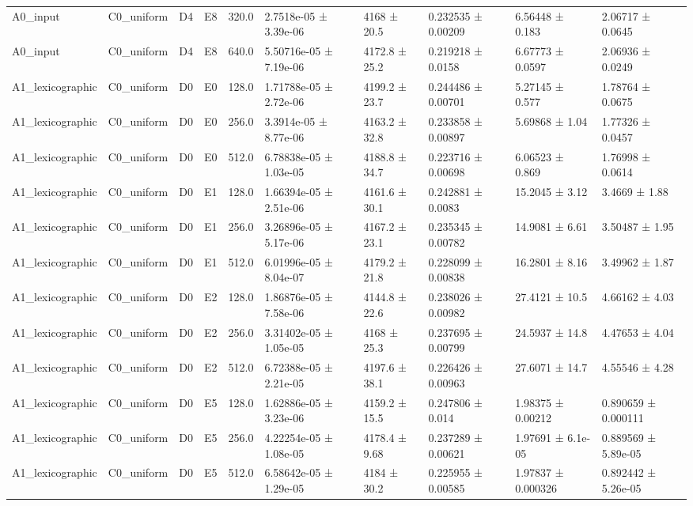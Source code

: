 \begin{table}
\begin{tabular}{llllllllll}
A0\_input & C0\_uniform & D4 & E8 & 320.0 & 2.7518e-05 ± 3.39e-06 & 4168 ± 20.5 & 0.232535 ± 0.00209 & 6.56448 ± 0.183 & 2.06717 ± 0.0645 \\
A0\_input & C0\_uniform & D4 & E8 & 640.0 & 5.50716e-05 ± 7.19e-06 & 4172.8 ± 25.2 & 0.219218 ± 0.0158 & 6.67773 ± 0.0597 & 2.06936 ± 0.0249 \\
A1\_lexicographic & C0\_uniform & D0 & E0 & 128.0 & 1.71788e-05 ± 2.72e-06 & 4199.2 ± 23.7 & 0.244486 ± 0.00701 & 5.27145 ± 0.577 & 1.78764 ± 0.0675 \\
A1\_lexicographic & C0\_uniform & D0 & E0 & 256.0 & 3.3914e-05 ± 8.77e-06 & 4163.2 ± 32.8 & 0.233858 ± 0.00897 & 5.69868 ± 1.04 & 1.77326 ± 0.0457 \\
A1\_lexicographic & C0\_uniform & D0 & E0 & 512.0 & 6.78838e-05 ± 1.03e-05 & 4188.8 ± 34.7 & 0.223716 ± 0.00698 & 6.06523 ± 0.869 & 1.76998 ± 0.0614 \\
A1\_lexicographic & C0\_uniform & D0 & E1 & 128.0 & 1.66394e-05 ± 2.51e-06 & 4161.6 ± 30.1 & 0.242881 ± 0.0083 & 15.2045 ± 3.12 & 3.4669 ± 1.88 \\
A1\_lexicographic & C0\_uniform & D0 & E1 & 256.0 & 3.26896e-05 ± 5.17e-06 & 4167.2 ± 23.1 & 0.235345 ± 0.00782 & 14.9081 ± 6.61 & 3.50487 ± 1.95 \\
A1\_lexicographic & C0\_uniform & D0 & E1 & 512.0 & 6.01996e-05 ± 8.04e-07 & 4179.2 ± 21.8 & 0.228099 ± 0.00838 & 16.2801 ± 8.16 & 3.49962 ± 1.87 \\
A1\_lexicographic & C0\_uniform & D0 & E2 & 128.0 & 1.86876e-05 ± 7.58e-06 & 4144.8 ± 22.6 & 0.238026 ± 0.00982 & 27.4121 ± 10.5 & 4.66162 ± 4.03 \\
A1\_lexicographic & C0\_uniform & D0 & E2 & 256.0 & 3.31402e-05 ± 1.05e-05 & 4168 ± 25.3 & 0.237695 ± 0.00799 & 24.5937 ± 14.8 & 4.47653 ± 4.04 \\
A1\_lexicographic & C0\_uniform & D0 & E2 & 512.0 & 6.72388e-05 ± 2.21e-05 & 4197.6 ± 38.1 & 0.226426 ± 0.00963 & 27.6071 ± 14.7 & 4.55546 ± 4.28 \\
A1\_lexicographic & C0\_uniform & D0 & E5 & 128.0 & 1.62886e-05 ± 3.23e-06 & 4159.2 ± 15.5 & 0.247806 ± 0.014 & 1.98375 ± 0.00212 & 0.890659 ± 0.000111 \\
A1\_lexicographic & C0\_uniform & D0 & E5 & 256.0 & 4.22254e-05 ± 1.08e-05 & 4178.4 ± 9.68 & 0.237289 ± 0.00621 & 1.97691 ± 6.1e-05 & 0.889569 ± 5.89e-05 \\
A1\_lexicographic & C0\_uniform & D0 & E5 & 512.0 & 6.58642e-05 ± 1.29e-05 & 4184 ± 30.2 & 0.225955 ± 0.00585 & 1.97837 ± 0.000326 & 0.892442 ± 5.26e-05 \\

\end{tabular}
\end{table}
